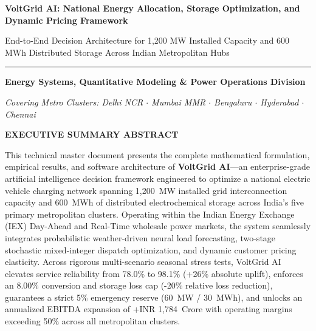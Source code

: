 \documentclass[10.5pt,a4paper]{article}
\begin{document}
\begin{titlepage}
    \centering
    \vspace*{0.8cm}
    {\Huge\bfseries\color{brandnavy} VoltGrid AI: National Energy Allocation, Storage Optimization, and Dynamic Pricing Framework\par}
    \vspace{0.6cm}
    {\Large\textsf{\color{brandblue} End-to-End Decision Architecture for 1,200 MW Installed Capacity and 600 MWh Distributed Storage Across Indian Metropolitan Hubs}\par}
    \vspace{0.8cm}
    \noindent\textcolor{brandborder}{\rule{0.95\textwidth}{1.5pt}}
    \vspace{0.8cm}

    {\large\textbf{\color{brandnavy} Energy Systems, Quantitative Modeling \& Power Operations Division}\par}
    \vspace{0.2cm}
    {\normalsize\textit{\color{brandslate} Covering Metro Clusters: Delhi NCR $\cdot$ Mumbai MMR $\cdot$ Bengaluru $\cdot$ Hyderabad $\cdot$ Chennai}\par}
    \vspace{0.6cm}

    \begin{minipage}{0.88\textwidth}
        \small\color{brandslate}
        \textbf{\color{brandnavy}EXECUTIVE SUMMARY ABSTRACT}\par
        \vspace{0.25cm}
        This technical master document presents the complete mathematical formulation, empirical results, and software architecture of \textbf{VoltGrid AI}---an enterprise-grade artificial intelligence decision framework engineered to optimize a national electric vehicle charging network spanning 1,200~MW installed grid interconnection capacity and 600~MWh of distributed electrochemical storage across India's five primary metropolitan clusters. Operating within the Indian Energy Exchange (IEX) Day-Ahead and Real-Time wholesale power markets, the system seamlessly integrates probabilistic weather-driven neural load forecasting, two-stage stochastic mixed-integer dispatch optimization, and dynamic customer pricing elasticity. Across rigorous multi-scenario seasonal stress tests, VoltGrid AI elevates service reliability from 78.0\% to 98.1\% (+26\% absolute uplift), enforces an 8.00\% conversion and storage loss cap (-20\% relative loss reduction), guarantees a strict 5\% emergency reserve (60~MW / 30~MWh), and unlocks an annualized EBITDA expansion of +INR 1,784~Crore with operating margins exceeding 50\% across all metropolitan clusters.
    \end{minipage}


\end{titlepage}
\end{document}
